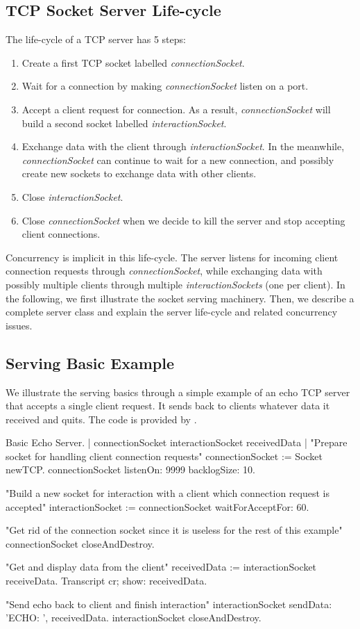 \documentclass[a4paper,10pt,twoside]{book}
\begin{document}
\subsection{TCP Socket Server Life-cycle}
The life-cycle of a TCP server has 5 steps:
\begin{enumerate}
\item Create a first TCP socket labelled \textit{connectionSocket}.
\item Wait for a connection by making \textit{connectionSocket}  listen on a port.
\item Accept a client request for connection. As a result, \textit{connectionSocket} will build a second socket labelled \textit{interactionSocket}.
\item Exchange data with the client through \textit{interactionSocket}. In the meanwhile, \textit{connectionSocket} can continue to wait for a new connection, and possibly create new sockets to exchange data with other clients. 
\item Close \textit{interactionSocket}.
\item Close \textit{connectionSocket} when we decide to kill the server and stop accepting client connections.
\end{enumerate}
Concurrency is implicit in this life-cycle.
The server listens for incoming client connection requests through \textit{connectionSocket}, while exchanging data with possibly multiple clients through multiple \textit{interactionSockets} (one per client).
In the following, we first illustrate the socket serving machinery.
Then, we describe a complete server class and explain the server life-cycle and related concurrency issues.

\subsection{Serving Basic Example}
We illustrate the serving basics through a simple example of an echo TCP server that accepts a single client request.
It sends back to clients whatever data it received and quits.
The code is provided by .

\begin{script}[servingBasicExample]{Basic Echo Server.}
| connectionSocket interactionSocket receivedData |
"Prepare socket for handling client connection requests"
connectionSocket := Socket newTCP.
connectionSocket listenOn: 9999 backlogSize: 10.

"Build a new socket for interaction with a client which connection request is accepted"
interactionSocket := connectionSocket waitForAcceptFor: 60.

"Get rid of the connection socket since it is useless for the rest of this example"
connectionSocket closeAndDestroy.

"Get and display data from the client"
receivedData := interactionSocket receiveData.
Transcript cr; show: receivedData.

"Send echo back to client and finish interaction"
interactionSocket sendData: 'ECHO: ', receivedData.
interactionSocket closeAndDestroy.
\end{script}
\end{document}
